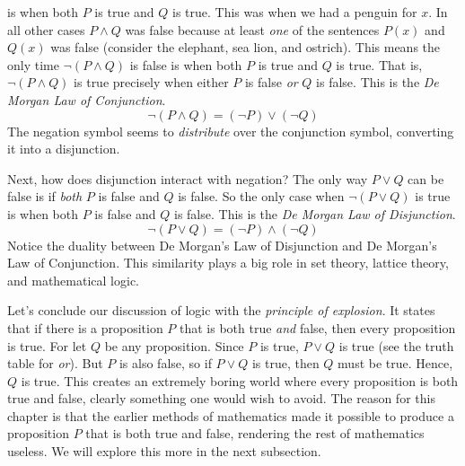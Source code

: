             is when both $P$ is true and $Q$ is true. This was when we had a
            penguin for $x$. In all other cases $P\land{Q}$ was false because
            at least \textit{one} of the sentences $P(x)$ and $Q(x)$ was false
            (consider the elephant, sea lion, and ostrich). This means the only
            time $\neg(P\land{Q})$ is false is when both $P$ is true and $Q$ is
            true. That is, $\neg(P\land{Q})$ is true precisely when either $P$
            is false \textit{or} $Q$ is false. This is the
            \textit{De Morgan Law of Conjunction}.
            \begin{equation}
                \neg(P\land{Q})=(\neg{P})\lor(\neg{Q})
            \end{equation}
            The negation symbol seems to \textit{distribute} over the
            conjunction symbol, converting it into a disjunction.
            \par\hfill\par
            Next, how does disjunction interact with negation? The only way
            $P\lor{Q}$ can be false is if \textit{both} $P$ is false and $Q$ is
            false. So the only case when $\neg(P\lor{Q})$ is true is when both
            $P$ is false and $Q$ is false. This is the
            \textit{De Morgan Law of Disjunction}.
            \begin{equation}
                \neg(P\lor{Q})=(\neg{P})\land(\neg{Q})
            \end{equation}
            Notice the duality between De Morgan's Law of Disjunction and
            De Morgan's Law of Conjunction. This similarity plays a big role
            in set theory, lattice theory, and mathematical logic.
            \par\hfill\par
            Let's conclude our discussion of logic with the
            \textit{principle of explosion}. It states that if there is a
            proposition $P$ that is both true \textit{and} false, then every
            proposition is true. For let $Q$ be any proposition. Since $P$ is
            true, $P\lor{Q}$ is true (see the truth table for \textit{or}). But
            $P$ is also false, so if $P\lor{Q}$ is true, then $Q$ must be true.
            Hence, $Q$ is true. This creates an extremely boring world where
            every proposition is both true and false, clearly something one
            would wish to avoid. The reason for this chapter is that the earlier
            methods of mathematics made it possible to produce a proposition
            $P$ that is both true and false, rendering the rest of mathematics
            useless. We will explore this more in the next subsection.
